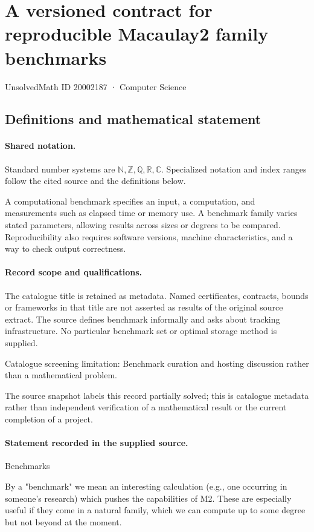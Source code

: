 \documentclass[11pt]{article}
\begin{document}
\setcounter{section}{20002186}
\section{A versioned contract for reproducible Macaulay2 family benchmarks}\label{20002187}
{\small\sffamily UnsolvedMath ID 20002187 · Computer Science}
\subsection{Definitions and mathematical statement}

\paragraph{Shared notation.}Standard number systems are $\mathbb N,\mathbb Z,\mathbb Q,\mathbb R,\mathbb C$. Specialized notation and index ranges follow the cited source and the definitions below.


A computational benchmark specifies an input, a computation, and measurements such as elapsed time or memory use. A benchmark family varies stated parameters, allowing results across sizes or degrees to be compared. Reproducibility also requires software versions, machine characteristics, and a way to check output correctness.
\paragraph{Record scope and qualifications.}
The catalogue title is retained as metadata. Named certificates, contracts, bounds or frameworks in that title are not asserted as results of the original source extract.
The source defines benchmark informally and asks about tracking infrastructure. No particular benchmark set or optimal storage method is supplied.

Catalogue screening limitation: Benchmark curation and hosting discussion rather than a mathematical problem.

The source snapshot labels this record partially solved; this is catalogue metadata rather than independent verification of a mathematical result or the current completion of a project.
\paragraph{Statement recorded in the supplied source.}
Benchmarks

By a "benchmark" we mean an interesting calculation (e.g., one occurring in someone's research) which pushes the capabilities of M2. These are especially useful if they come in a natural family, which we can compute up to some degree but not beyond at the moment.
\end{document}
